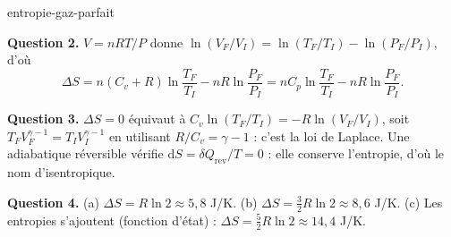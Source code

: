 \begin{exo}{entropie-gaz-parfait}
\begin{solution}
\textbf{Question 2.} $V = nRT/P$ donne $\ln(V_F/V_I) = \ln(T_F/T_I) - \ln(P_F/P_I)$, d'où
\[
\Delta S = n(C_v + R)\ln\frac{T_F}{T_I} - nR\ln\frac{P_F}{P_I} = nC_p\ln\frac{T_F}{T_I} - nR\ln\frac{P_F}{P_I}.
\]

\textbf{Question 3.} $\Delta S = 0$ équivaut à $C_v\ln(T_F/T_I) = -R\ln(V_F/V_I)$, soit $T_FV_F^{\gamma-1} = T_IV_I^{\gamma-1}$ en utilisant $R/C_v = \gamma - 1$ : c'est la loi de Laplace. Une adiabatique réversible vérifie $\mathrm{d}S = \delta Q_{\text{rev}}/T = 0$ : elle conserve l'entropie, d'où le nom d'isentropique.

\textbf{Question 4.} (a) $\Delta S = R\ln 2 \approx 5{,}8$ J/K. (b) $\Delta S = \tfrac{3}{2}R\ln 2 \approx 8{,}6$ J/K. (c) Les entropies s'ajoutent (fonction d'état) : $\Delta S = \tfrac{5}{2}R\ln 2 \approx 14{,}4$ J/K.
\end{solution}
\end{exo}

